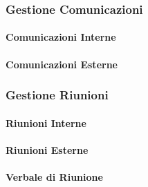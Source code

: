 \subsubsection{Gestione Comunicazioni}

\paragraph{Comunicazioni Interne}

\paragraph{Comunicazioni Esterne}


\subsubsection{Gestione Riunioni}

\paragraph{Riunioni Interne}

\paragraph{Riunioni Esterne}

\paragraph{Verbale di Riunione}